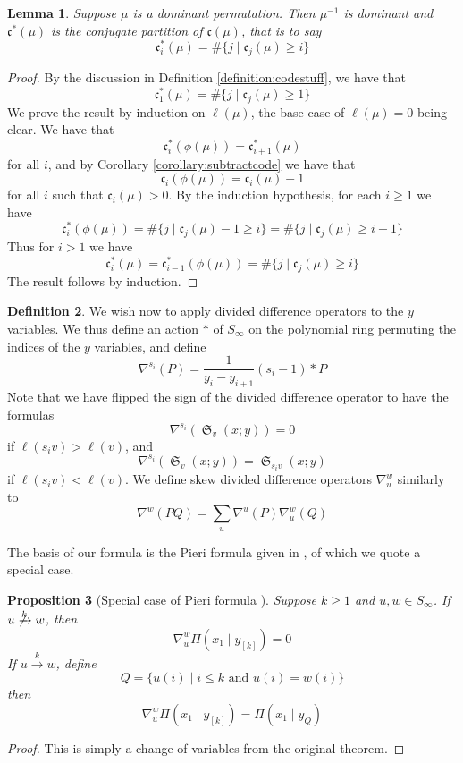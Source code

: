 \documentclass{amsart}
\newtheorem{lemma}{Lemma}[subsection]
\newtheorem{proposition}[lemma]{Proposition}
\theoremstyle{definition}
\newtheorem{definition}[lemma]{Definition}
\theoremstyle{remark}
\numberwithin{equation}{subsection}
\DeclareMathOperator{\sch}{\mathfrak{S}}
\newcommand{\tom}[1]{\xrightarrow{#1}}
\newcommand{\smpfu}{\mathsf{\Pi}}
\newcommand{\smpr}[3]{\ensuremath{}\smpfu\left( #1 \mid #2_{[#3]}\right)}
\newcommand{\smpre}[2]{\ensuremath{}\smpfu\left( #1 \mid #2\right)}
\newcommand{\code}{\mathfrak{c}}
\begin{document}
\begin{lemma} \label{lemma:invdom}
	Suppose $\mu$ is a dominant permutation. Then $\mu^{-1}$ is dominant and $\code^*(\mu)$ is the conjugate partition of $\code(\mu)$, that is to say
	$$\code^*_i(\mu)=\#\{j\mid \code_j(\mu)\geq i\}$$
\end{lemma}
\begin{proof}
	By the discussion in Definition \ref{definition:codestuff}, we have that
	$$\code^*_1(\mu)=\#\{j\mid \code_j(\mu)\geq 1\}$$
	We prove the result by induction on $\ell(\mu)$, the base case of $\ell(\mu)=0$ being clear. We have that
	$$\code^*_i(\phi(\mu))=\code^*_{i+1}(\mu)$$
	for all $i$, and by Corollary \ref{corollary:subtractcode} we have that
	$$\code_i(\phi(\mu))=\code_i(\mu)-1$$
	for all $i$ such that $\code_i(\mu)>0$. By the induction hypothesis, for each $i\geq 1$ we have
	$$\code^*_i(\phi(\mu))=\#\{j\mid \code_j(\mu)-1\geq i\}=\#\{j\mid \code_j(\mu)\geq i+1\}$$
	Thus for $i>1$ we have
	$$\code^*_i(\mu)=\code_{i-1}^*(\phi(\mu))=\#\{j\mid \code_j(\mu)\geq i\}$$
	The result follows by induction.
\end{proof}


\begin{definition} \label{definition:ydiff}
We wish now to apply divided difference operators to the $y$ variables. We thus define an action $*$ of $S_\infty$ on the polynomial ring permuting the indices of the $y$ variables, and define
$$\nabla^{s_i}(P)=\frac1{y_i-y_{i+1}}(s_i-1) * P$$
Note that we have flipped the sign of the divided difference operator to have the formulas
$$\nabla^{s_i}(\sch_v(x;y))=0$$
if $\ell(s_iv)>\ell(v)$, and
$$\nabla^{s_i}(\sch_v(x;y))=\sch_{s_iv}(x;y)$$
if $\ell(s_iv)<\ell(v)$.
We define skew divided difference operators $\nabla_u^w$ similarly to
$$\nabla^w(PQ)=\sum_u \nabla^u(P)\nabla_u^w(Q)$$
\end{definition}

The basis of our formula is the Pieri formula given in \cite{samuelmolev}, of which we quote a special case.

\begin{proposition}[Special case of Pieri formula {\cite[Theorem~7.1]{samuelmolev}}] \label{proposition:pieri}
Suppose $k\geq 1$ and $u,w\in S_\infty$. If $u\not\tom{k} w$, then
$$\nabla_u^w\smpr{x_1}{y}{k}=0$$
If $u\tom{k} w$, define
$$Q = \{u(i)\mid i\leq k\mbox{ and }u(i)=w(i)\}$$
then
$$\nabla_u^w\smpr{x_1}{y}{k}=\smpre{x_1}{y_Q}$$
\end{proposition}
\begin{proof}
	This is simply a change of variables from the original theorem.
\end{proof}
\end{document}
